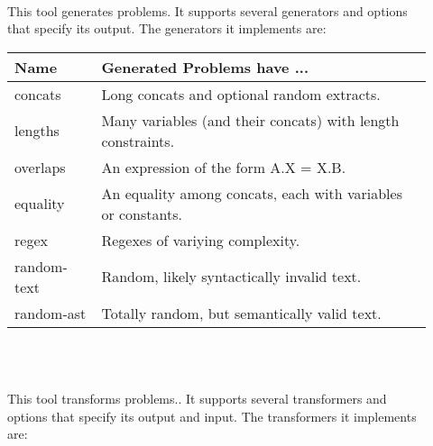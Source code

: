     \begin{description}

        \item[\generator{}] \hfill \\
            This tool generates \smt{} problems. It supports several generators and options that specify its output. The generators it implements are: \\

            \begin{tabular}{|l|l|}
                \hline
                \textbf{Name} & \textbf{Generated Problems have ...} \\ \hline
                concats       & Long concats and optional random extracts. \\ \hline
                lengths       & Many variables (and their concats) with length constraints. \\ \hline
                overlaps      & An expression of the form A.X = X.B. \\ \hline
                equality      & An equality among concats, each with variables or constants. \\ \hline
                regex         & Regexes of variying complexity. \\ \hline
                random-text   & Random, likely syntactically invalid text. \\ \hline
                random-ast    & Totally random, but semantically valid text. \\ \hline
            \end{tabular}

            \hfill \\

        \item[\transformer{}] \hfill \\

            This tool transforms \smt{} problems.. It supports several transformers and options that specify its output and input. The transformers it implements are: \\



\end{description}
